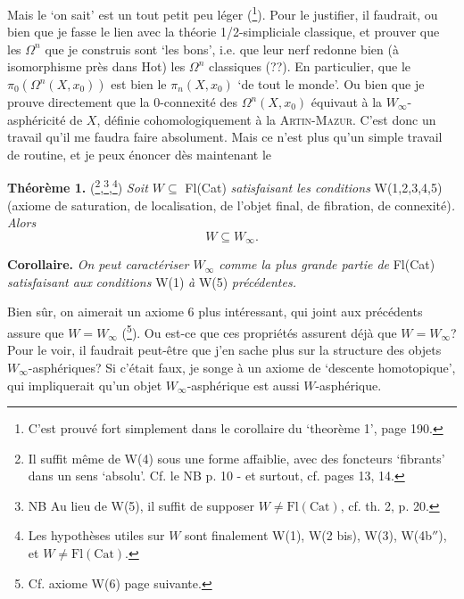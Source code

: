 Mais le `on sait' est un tout petit peu léger (\footnote[25]{C'est prouvé fort simplement dans le corollaire du `theorème 1', page 190.}). Pour le justifier, il faudrait, ou bien %
que je fasse le lien avec la théorie 1/2-simpliciale classique, et prouver que les $\Omega^n$ que je construis sont `les bons', i.e. que leur nerf redonne bien (à isomorphisme près dans Hot) les $\Omega^n$ classiques (??). En particulier, que le $\pi_0(\Omega^n(X, x_0))$ est bien le $\pi_n(X, x_0)$ `de tout le monde'. Ou bien que je prouve directement que la 0-connexité des $\Omega^n(X, x_0)$ équivaut à la $W_\infty$-asphéricité de $X$, définie cohomologiquement à la \textsc{Artin-Mazur}. C'est donc un travail qu'il me faudra faire absolument. Mais ce n'est plus qu'un simple travail de routine, et je peux énoncer dès maintenant le

\textbf{Théorème 1.} (\footnote[26]{Il suffit même de W(4) sous une forme affaiblie, avec des foncteurs `fibrants' dans un sens `absolu'. Cf. le NB p. 10 - et surtout, cf. pages 13, 14.},\footnote[27]{NB Au lieu de W(5), il suffit de supposer $W \neq \mathrm{Fl}(\mathrm{Cat})$, cf. th. 2, p. 20.},\footnote[28]{Les hypothèses utiles sur $W$ sont finalement W(1), W(2 bis), W(3), W(4b$''$), et $W \neq \mathrm{Fl}(\mathrm{Cat})$.}) \textit{Soit $W \subseteq$} Fl(Cat) \textit{satisfaisant les conditions} W(1,2,3,4,5) (axiome de saturation, de localisation, de l'objet final, de fibration, de connexité)\textit{. Alors}
\[ W \subseteq W_\infty . \]

\textbf{Corollaire.} \textit{On peut caractériser $W_\infty$ comme la plus grande partie de} Fl(Cat) \textit{satisfaisant aux}
\textit{conditions} W(1) \textit{à} W(5) \textit{précédentes.}

Bien sûr, on aimerait un axiome 6 plus intéressant, qui joint aux précédents assure que $W = W_\infty$ (\footnote[29]{Cf. axiome W(6) page suivante.}). Ou est-ce que ces propriétés assurent déjà que $W = W_\infty$? Pour le voir, il faudrait peut-être que j'en sache plus sur la structure des objets $W_\infty$-asphériques? Si c'était faux, je songe à un axiome de `descente homotopique', qui impliquerait qu'un objet $W_\infty$-asphérique est aussi $W$-asphérique.

